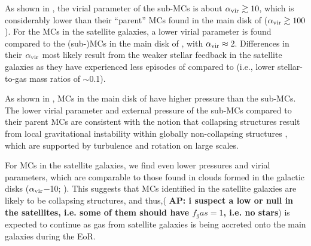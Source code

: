 \IfFileExists{emulateapjlegacy.cls}{\documentclass[iop]{emulateapjlegacy}}{\documentclass[iop]{emulateapj}}
\newcommand{\AP}[1]{({\bf \color{apcolor} AP: #1})}
\begin{document}

As shown in ,
the virial parameter of the sub-MCs is about $\alpha_{\rm vir}\gtrsim10$, which is considerably lower than their ``parent'' MCs found in the main disk of \flower ($\alpha_{\rm vir}\gtrsim100$).
%
For the MCs in the satellite galaxies, a lower virial parameter is found compared to the (sub-)MCs in the main disk of \flower, with $\alpha_{\rm vir}\approx$\,2.
Differences in their $\alpha_{\rm vir}$ most likely result from the weaker stellar feedback in the satellite galaxies as they have experienced less episodes of \SF compared to \flower (i.e., lower stellar-to-gas mass ratios of $\sim$0.1).

As shown in ,
MCs in the main disk of \flower have higher pressure than the sub-MCs. The lower virial parameter and external pressure of the sub-MCs compared to their parent MCs are consistent with the notion that collapsing structures result from local gravitational instability within globally non-collapsing structures \citep[see e.g.,][]{Ballesteros-Paredes11a}, which are supported by turbulence and rotation on large scales.

For MCs in the satellite galaxies, we find even lower pressures and virial parameters, which are comparable to those found in clouds formed in the galactic disks  ($\alpha_{\rm vir}$$-$10; \citealt{Dobbs08a, Tasker09a}).
This suggests that MCs identified in the satellite galaxies are likely to be collapsing structures, and thus,\AP{i suspect a low or null \SF in the satellites, i.e. some of them should have $f_gas = 1$, i.e. no stars} \SF is expected to continue as gas from satellite galaxies is being accreted onto the main galaxies during the EoR.
\end{document}
